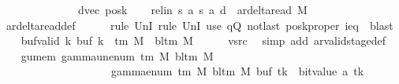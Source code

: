 \begin{isabellebody}
\ \ \ \ \ \ \ \ \ \ \ \ \ \ dvec{\isacharcomma}{\kern0pt}\ posk{\isacharparenright}{\kern0pt}{\isachardoublequoteclose}\isanewline
\ \ \isamarkupfalse%
\ rel{\isacharunderscore}{\kern0pt}in{\isacharcolon}{\kern0pt}\ {\isachardoublequoteopen}{\isacharparenleft}{\kern0pt}{\isacharquery}{\kern0pt}s{\isacharcomma}{\kern0pt}\ {\isacharquery}{\kern0pt}a{\isacharcomma}{\kern0pt}\ {\isacharquery}{\kern0pt}s{\isacharprime}{\kern0pt}{\isacharcomma}{\kern0pt}\ {\isacharquery}{\kern0pt}a{\isacharcomma}{\kern0pt}\ {\isacharquery}{\kern0pt}d{\isacharparenright}{\kern0pt}\ {\isasymin}\ ar{\isacharunderscore}{\kern0pt}delta{\isacharunderscore}{\kern0pt}read\ M{\isachardoublequoteclose}\isanewline
\ \ \ \ \isamarkupfalse%
\ ar{\isacharunderscore}{\kern0pt}delta{\isacharunderscore}{\kern0pt}read{\isacharunderscore}{\kern0pt}def\isanewline
\ \ \ \ \isamarkupfalse%
\ {\isacharparenleft}{\kern0pt}rule\ UnI{}{\isacharcomma}{\kern0pt}\ rule\ UnI{}{\isacharparenright}{\kern0pt}\ {\isacharparenleft}{\kern0pt}use\ qQ\ notlast\ posk{\isacharunderscore}{\kern0pt}proper\ ieq\ \ blast{\isacharparenright}{\kern0pt}\isanewline
\ \ \isamarkupfalse%
\ buf{\isacharunderscore}{\kern0pt}valid{\isacharcolon}{\kern0pt}\ {\isachardoublequoteopen}{\isasymforall}k{\isachardot}{\kern0pt}\ buf\ k\ {\isasymin}\ {\isasymGamma}{\isacharunderscore}{\kern0pt}tm\ M\ {\isasymunion}\ {\isacharbraceleft}{\kern0pt}bl{\isacharunderscore}{\kern0pt}tm\ M{\isacharbraceright}{\kern0pt}{\isachardoublequoteclose}\isanewline
\ \ \ \ \isamarkupfalse%
\ vsrc\ \isamarkupfalse%
\ {\isacharparenleft}{\kern0pt}simp\ add{\isacharcolon}{\kern0pt}\ ar{\isacharunderscore}{\kern0pt}valid{\isacharunderscore}{\kern0pt}stage{\isacharunderscore}{\kern0pt}def{\isacharparenright}{\kern0pt}\isanewline
\ \ \isamarkupfalse%
\ gu{\isacharunderscore}{\kern0pt}mem{\isacharcolon}{\kern0pt}\ {\isachardoublequoteopen}gamma{\isacharunderscore}{\kern0pt}unenum\ {\isacharparenleft}{\kern0pt}{\isasymGamma}{\isacharunderscore}{\kern0pt}tm\ M{\isacharparenright}{\kern0pt}\ {\isacharparenleft}{\kern0pt}bl{\isacharunderscore}{\kern0pt}tm\ M{\isacharparenright}{\kern0pt}\isanewline
\ \ \ \ \ \ \ \ \ \ \ \ \ \ \ \ \ \ {\isacharparenleft}{\kern0pt}{}\ {\isacharasterisk}{\kern0pt}\ gamma{\isacharunderscore}{\kern0pt}enum\ {\isacharparenleft}{\kern0pt}{\isasymGamma}{\isacharunderscore}{\kern0pt}tm\ M{\isacharparenright}{\kern0pt}\ {\isacharparenleft}{\kern0pt}bl{\isacharunderscore}{\kern0pt}tm\ M{\isacharparenright}{\kern0pt}\ {\isacharparenleft}{\kern0pt}buf\ tk{\isacharparenright}{\kern0pt}\ {\isacharplus}{\kern0pt}\ bit{\isacharunderscore}{\kern0pt}value\ {\isacharparenleft}{\kern0pt}{\isacharquery}{\kern0pt}a\ tk{\isacharparenright}{\kern0pt}{\isacharparenright}{\kern0pt}\isanewline

\end{isabellebody}
